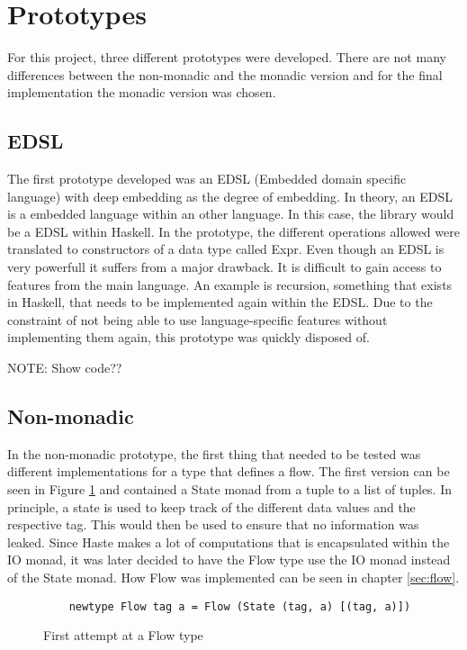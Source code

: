\section{Prototypes}
\label{chapter:prototypes}
For this project, three different prototypes were developed. There are not many differences between the non-monadic and the monadic version and for the final implementation the monadic version was chosen.
\subsection{EDSL}
The first prototype developed was an EDSL (Embedded domain specific language)\cite{haskell_edsl} with deep embedding as the degree of embedding. In theory, an EDSL is a embedded language within an other language. In this case, the library would be a EDSL within Haskell. In the prototype, the different operations allowed were translated to constructors of a data type called Expr. Even though an EDSL is very powerfull it suffers from a major drawback. It is difficult to gain access to features from the main language. An example is recursion, something that exists in Haskell, that needs to be implemented again within the EDSL. Due to the constraint of not being able to use language-specific features without implementing them again, this prototype was quickly disposed of.

NOTE: Show code??
\subsection{Non-monadic}
In the non-monadic prototype, the first thing that needed to be tested was different implementations for a type that defines a flow. The first version can be seen in Figure \ref{fig:first_flow} and contained a State monad from a tuple to a list of tuples. In principle, a state is used to keep track of the different data values and the respective tag. This would then be used to ensure that no information was leaked. Since Haste makes a lot of computations that is encapsulated within the IO monad, it was later decided to have the Flow type use the IO monad instead of the State monad. How Flow was implemented can be seen in chapter \ref{sec:flow}.
\begin{figure}[h]
  \lstset{language=Haskell}
  \begin{lstlisting}
    newtype Flow tag a = Flow (State (tag, a) [(tag, a)])
  \end{lstlisting}
  \caption{First attempt at a Flow type}
  \label{fig:first_flow}
\end{figure}

